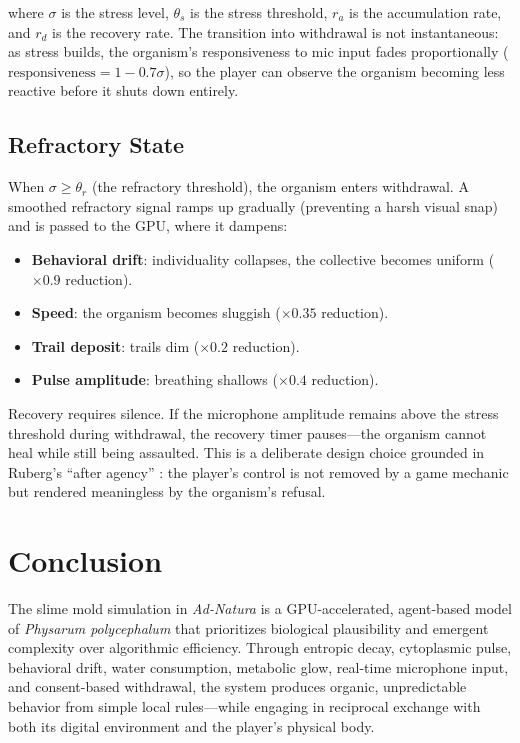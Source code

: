\documentclass[12pt, titlepage]{article}
\begin{document}
where $\sigma$ is the stress level, $\theta_s$ is the stress threshold,
$r_a$ is the accumulation rate, and $r_d$ is the recovery rate. The transition
into withdrawal is not instantaneous: as stress builds, the organism's
responsiveness to mic input fades proportionally
($\text{responsiveness} = 1 - 0.7\sigma$), so the player can observe the
organism becoming less reactive before it shuts down entirely.

\subsection{Refractory State}

When $\sigma \geq \theta_r$ (the refractory threshold), the organism enters
withdrawal. A smoothed refractory signal ramps up gradually (preventing a
harsh visual snap) and is passed to the GPU, where it dampens:

\begin{itemize}
    \item \textbf{Behavioral drift}: individuality collapses, the collective
    becomes uniform ($\times 0.9$ reduction).
    \item \textbf{Speed}: the organism becomes sluggish ($\times 0.35$
    reduction).
    \item \textbf{Trail deposit}: trails dim ($\times 0.2$ reduction).
    \item \textbf{Pulse amplitude}: breathing shallows ($\times 0.4$
    reduction).
\end{itemize}

Recovery requires silence. If the microphone amplitude remains above the
stress threshold during withdrawal, the recovery timer pauses---the organism
cannot heal while still being assaulted. This is a deliberate design
choice grounded in Ruberg's ``after agency'' \cite{ruberg2022}: the player's
control is not removed by a game mechanic but rendered meaningless by the
organism's refusal.

\section{Conclusion}
\label{sec:conclusion}

The slime mold simulation in \textit{Ad-Natura} is a GPU-accelerated,
agent-based model of \textit{Physarum polycephalum} that prioritizes biological
plausibility and emergent complexity over algorithmic efficiency. Through
entropic decay, cytoplasmic pulse, behavioral drift, water consumption,
metabolic glow, real-time microphone input, and consent-based withdrawal, the
system produces organic, unpredictable behavior from simple local
rules---while engaging in reciprocal exchange with both its digital
environment and the player's physical body.
\end{document}
